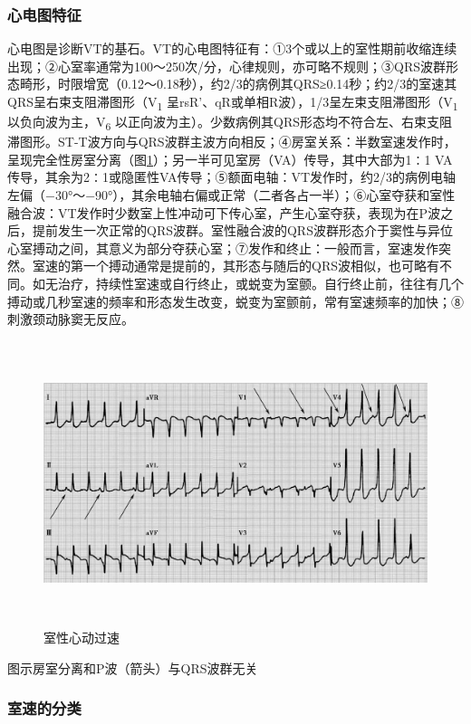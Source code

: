 \subsubsection{心电图特征}

心电图是诊断VT的基石。VT的心电图特征有：①3个或以上的室性期前收缩连续出现；②心室率通常为100～250次/分，心律规则，亦可略不规则；③QRS波群形态畸形，时限增宽（0.12～0.18秒），约2/3的病例其QRS≥0.14秒；约2/3的室速其QRS呈右束支阻滞图形（V\textsubscript{1}
呈rsR'、qR或单相R波），1/3呈左束支阻滞图形（V\textsubscript{1}
以负向波为主，V\textsubscript{6}
以正向波为主）。少数病例其QRS形态均不符合左、右束支阻滞图形。ST-T波方向与QRS波群主波方向相反；④房室关系：半数室速发作时，呈现完全性房室分离（图\ref{fig102-9}）；另一半可见室房（VA）传导，其中大部为1∶1
VA传导，其余为2∶1或隐匿性VA传导；⑤额面电轴：VT发作时，约2/3的病例电轴左偏（−30°～−90°），其余电轴右偏或正常（二者各占一半）；⑥心室夺获和室性融合波：VT发作时少数室上性冲动可下传心室，产生心室夺获，表现为在P波之后，提前发生一次正常的QRS波群。室性融合波的QRS波群形态介于窦性与异位心室搏动之间，其意义为部分夺获心室；⑦发作和终止：一般而言，室速发作突然。室速的第一个搏动通常是提前的，其形态与随后的QRS波相似，也可略有不同。如无治疗，持续性室速或自行终止，或蜕变为室颤。自行终止前，往往有几个搏动或几秒室速的频率和形态发生改变，蜕变为室颤前，常有室速频率的加快；⑧刺激颈动脉窦无反应。

\begin{figure}[!htbp]
 \centering
 \includegraphics[width=6.29167in,height=3.27083in]{./images/Image00440.jpg}
 \captionsetup{justification=centering}
 \caption{室性心动过速}
 \label{fig102-9}
  \end{figure} 

图示房室分离和P波（箭头）与QRS波群无关

\subsubsection{室速的分类}

